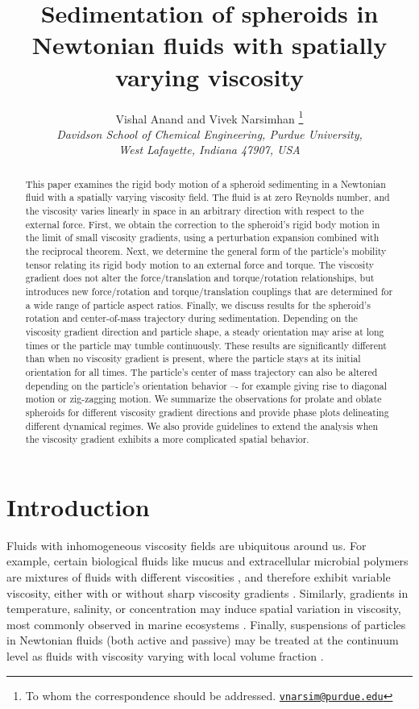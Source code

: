 \documentclass{jfm}
\title{Sedimentation of  spheroids in Newtonian fluids with spatially varying viscosity }
\author{Vishal Anand and Vivek Narsimhan \footnote{To whom the correspondence should be addressed. \href{mailto:vnarsim@purdue.edu}{\texttt{vnarsim@purdue.edu}}}\\
\textit{Davidson School of Chemical Engineering, Purdue University,}\\ \textit{West Lafayette, Indiana 47907, USA}}
\begin{document}
\maketitle

\begin{abstract}
This paper examines the rigid body motion of a spheroid sedimenting in a Newtonian fluid with a spatially varying viscosity field. The fluid is at zero Reynolds number, and the viscosity varies linearly in space in an arbitrary direction with respect to the external force.  First, we obtain the correction to the spheroid’s rigid body motion in the limit of small viscosity gradients, using a perturbation expansion combined with the reciprocal theorem.  Next, we determine the general form of the particle’s mobility tensor relating its rigid body motion to an external force and torque.  The viscosity gradient does not alter the force/translation and torque/rotation relationships, but introduces new force/rotation and torque/translation couplings that are determined for a wide range of particle aspect ratios.  Finally, we discuss results for the spheroid’s rotation and center-of-mass trajectory during sedimentation.  Depending on the viscosity gradient direction and particle shape, a steady orientation may arise at long times or the particle may tumble continuously.  These results are significantly different than when no viscosity gradient is present, where the particle stays at its initial orientation for all times.  The particle’s center of mass trajectory can also be altered depending on the particle’s orientation behavior –- for example giving rise to diagonal motion or zig-zagging motion.  We summarize the observations for prolate and oblate spheroids for different viscosity gradient directions and provide phase plots delineating different dynamical regimes.  We also provide guidelines to extend the analysis when the viscosity gradient exhibits a more complicated spatial behavior.
\end{abstract}

\section{Introduction}
\label{sec:intro_transient}
Fluids with inhomogeneous viscosity fields are ubiquitous around us. For example, certain biological fluids like mucus and extracellular microbial polymers are mixtures of fluids with different viscosities \citep{EColi_Berg}, and therefore exhibit variable viscosity, either with \citep{HelicalSwimmer_ViscosityGradients} or without sharp viscosity gradients \citep{Du_PRE_2012}. Similarly, gradients in temperature, salinity, or concentration may induce spatial variation in  viscosity, most commonly observed in marine ecosystems \citep{Arrigo_Robinson_Worthen_Dunbar_DiTullo_VanWoert_Science_99}. Finally, suspensions of particles in Newtonian fluids  (both active and passive) may be treated at the continuum level as fluids with viscosity varying with local volume fraction \citep{Rafai_Effective_Microswimmer,Hatwalne_PRL_2004}.  
\end{document}
